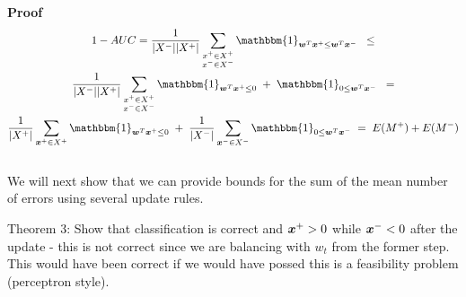 {\bf Proof} 
\begin{multline}
1 - AUC = \frac{1}{|X^-| |X^+|} \sum\limits_{ \substack{x^+ \in X^+ \\ x^- \in X^-}} {  \mathbbm{1}_{\vw^T \vx^+ \leq \vw^T \vx^-} } \;\;\leq \\
\frac{1}{|X^-| |X^+|}  \sum\limits_{ \substack{x^+ \in X^+ \\ x^- \in X^-}} {  \mathbbm{1}_{\vw^T \vxp \leq 0} \;+\; \mathbbm{1}_{0 \leq \vw^T \vxn}  }  \;\;= \\
\frac{1}{|X^+|}  \sum\limits_{\vxp \in X^+}{  \mathbbm{1}_{\vw^T \vxp \leq 0} } \;+\; \frac{1}{|X^-|}  \sum\limits_{\vxn \in X^-}{\mathbbm{1}_{0 \leq \vw^T \vxn }  }   \;= \;
E(M^+) + E(M^-)
\end{multline}
\hfill\BlackBox \\


We will next show that we can provide bounds for the sum of the mean number of errors using several update rules.


Theorem 3: Show that classification is correct and $\bm{x}^+ >0$ while $\bm{x}^- < 0$ after the update - this is not correct since we are balancing with $w_t$ from the former step.
This would have been correct if we would have possed this is a feasibility problem (perceptron style).

